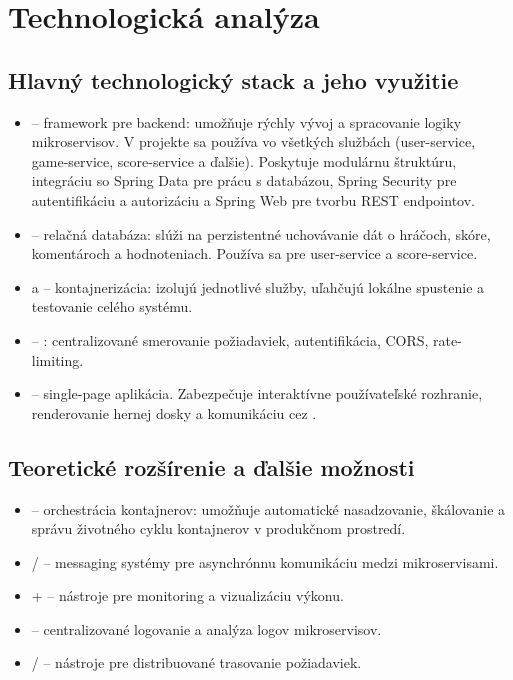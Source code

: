\section{Technologická analýza}
\subsection{Hlavný technologický stack a jeho využitie}
\begin{itemize}
    \item {} – framework pre backend: umožňuje rýchly vývoj  a spracovanie logiky mikroservisov. V projekte sa používa vo všetkých službách (user-service, game-service, score-service a ďalšie). Poskytuje modulárnu štruktúru, integráciu so Spring Data pre prácu s databázou, Spring Security pre autentifikáciu a autorizáciu a Spring Web pre tvorbu REST endpointov.
    \item {} – relačná databáza: slúži na perzistentné uchovávanie dát o hráčoch, skóre, komentároch a hodnoteniach. Používa sa pre user-service a score-service.
    \item {} a  – kontajnerizácia: izolujú jednotlivé služby, uľahčujú lokálne spustenie a testovanie celého systému.
    \item {} – : centralizované smerovanie požiadaviek, autentifikácia, CORS, rate-limiting.
    \item {} – single-page aplikácia. Zabezpečuje interaktívne používateľské rozhranie, renderovanie hernej dosky a komunikáciu cez .
\end{itemize}

\subsection{Teoretické rozšírenie a ďalšie možnosti}
\begin{itemize}
    \item {} – orchestrácia kontajnerov: umožňuje automatické nasadzovanie, škálovanie a správu životného cyklu kontajnerov v produkčnom prostredí.
    \item {} /  – messaging systémy pre asynchrónnu komunikáciu medzi mikroservisami.
    \item {} +  – nástroje pre monitoring a vizualizáciu výkonu.
    \item {} – centralizované logovanie a analýza logov mikroservisov.
    \item {} /  – nástroje pre distribuované trasovanie požiadaviek.
\end{itemize}

